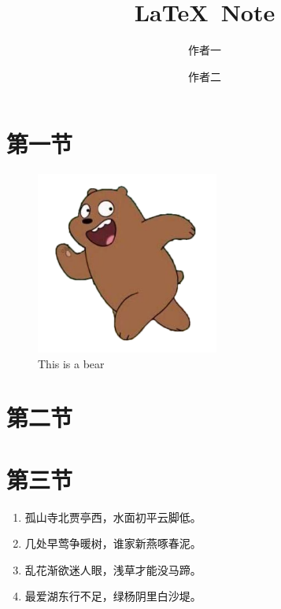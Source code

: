 \documentclass[%
aps,
prl,
12pt, 
twocolumn,
preprint,
reprint,
amsmath,
amssymb
]{revtex4-1}
\begin{document}
\title{\LaTeX~Note} 
\author{作者一} 
\author{作者二} 

\begin{abstract}
\zhlipsum[1]

\end{abstract}

%
\maketitle %
%
\section{第一节}

\zhlipsum[1]

\begin{figure} [h]
\includegraphics[width=6cm]{Fig1.png}
\caption{This is a bear}
\label{fig1}
\end{figure}

\section{第二节}
\zhlipsum[1]
\section{第三节}

\begin{enumerate}
\item 孤山寺北贾亭西，水面初平云脚低。
\item 几处早莺争暖树，谁家新燕啄春泥。
\item 乱花渐欲迷人眼，浅草才能没马蹄。
\item 最爱湖东行不足，绿杨阴里白沙堤。 

\end{enumerate}


\end{document}

